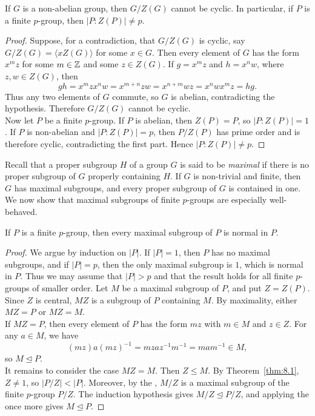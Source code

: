 \documentclass[../Odyssey_Project.tex]{subfiles}
\begin{document}
\begin{lemma}
\label{lem:8.2}
If $G$ is a non-abelian group, then $G/Z(G)$ cannot be cyclic. In particular, if $P$ is a finite $p$-group, then $|P:Z(P)| \neq p$.
\end{lemma}
\begin{proof}
Suppose, for a contradiction, that $G/Z(G)$ is cyclic, say $G/Z(G)=\langle xZ(G)\rangle$ for some $x\in G$. Then every element of $G$ has the form $x^m z$ for some $m\in \mathbb{Z}$ and some $z\in Z(G)$. If $g=x^m z$ and $h=x^n w$, where $z,w\in Z(G)$, then
\[
    gh=x^m z x^n w=x^{m+n}zw=x^{n+m}wz=x^n w x^m z=hg.
\]
Thus any two elements of $G$ commute, so $G$ is abelian, contradicting the hypothesis. Therefore $G/Z(G)$ cannot be cyclic.\\
Now let $P$ be a finite $p$-group. If $P$ is abelian, then $Z(P)=P$, so $\lvert P:Z(P)\rvert=1$. If $P$ is non-abelian and $\lvert P:Z(P)\rvert=p$, then $P/Z(P)$ has prime order and is therefore cyclic, contradicting the first part. Hence $\lvert P:Z(P)\rvert\neq p$.
\end{proof}

Recall that a proper subgroup $H$ of a group $G$ is said to be \emph{maximal} if there is no proper subgroup of $G$ properly containing $H$. If $G$ is non-trivial and finite, then $G$ has maximal subgroups, and every proper subgroup of $G$ is contained in one. We now show that maximal subgroups of finite $p$-groups are especially well-behaved.

\begin{proposition}
\label{prop:8.3}
If $P$ is a finite $p$-group, then every maximal subgroup of $P$ is normal in $P$.
\end{proposition}
\begin{proof}
We argue by induction on $\lvert P\rvert$. If $\lvert P\rvert=1$, then $P$ has no maximal subgroups, and if $\lvert P\rvert=p$, then the only maximal subgroup is $1$, which is normal in $P$. Thus we may assume that $\lvert P\rvert>p$ and that the result holds for all finite $p$-groups of smaller order. Let $M$ be a maximal subgroup of $P$, and put $Z=Z(P)$. Since $Z$ is central, $MZ$ is a subgroup of $P$ containing $M$. By maximality, either $MZ=P$ or $MZ=M$.\\
If $MZ=P$, then every element of $P$ has the form $mz$ with $m\in M$ and $z\in Z$. For any $a\in M$, we have
\[
    (mz)a(mz)^{-1}=mza z^{-1}m^{-1}=mam^{-1}\in M,
\]
so $M\trianglelefteq P$.\\
It remains to consider the case $MZ=M$. Then $Z\leq M$. By Theorem~\ref{thm:8.1}, $Z\neq 1$, so $\lvert P/Z\rvert<\lvert P\rvert$. Moreover, by the , $M/Z$ is a maximal subgroup of the finite $p$-group $P/Z$. The induction hypothesis gives $M/Z\trianglelefteq P/Z$, and applying the  once more gives $M\trianglelefteq P$.
\end{proof}
\end{document}
